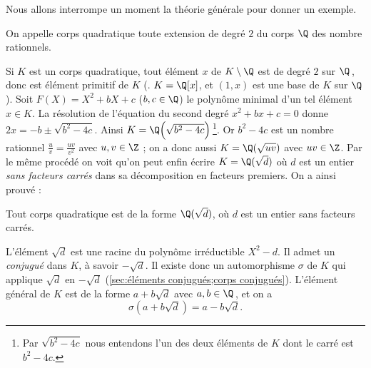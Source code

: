 \documentclass[11pt, %
  title in boldface,
  theorem in new line,
  theorem numbering = section,
  number theorems separately,
  simple name,
]{beaulivre}
\begin{document}
    Nous allons interrompe un moment la théorie générale pour donner un exemple.

    \begin{definition}
        On appelle corps quadratique toute extension de degré \( 2 \) du corps \( \Q \) des nombre rationnels.
    \end{definition}

    Si \( K \) est un corps quadratique, tout élément \( x \) de \( K \setminus \Q \) est de degré \( 2 \) sur \( \Q \)\,, donc est élément primitif de \( K \) (\ie. \( K = \Q[x] \), et \( (1,x) \) est une base de \( K \) sur \( \Q \)). Soit \( F(X) = X^2+bX+c \) (\( b,c \in \Q \)) le polynôme minimal d'un tel élément \( x \in K \). La résolution de l'équation du second degré \( x^2+bx+c = 0 \) donne \( 2x = -b \pm \sqrt{b^2-4c} \). Ainsi \( K = \Q\Bigl(\sqrt{b^2-4c}\Bigr) \)\,\footnote{Par \( \sqrt{b^2-4c} \) nous entendons l'un des deux éléments de \( K \) dont le carré est \( b^2-4c \).}. Or \( b^2-4c \) est un nombre rationnel \( \frac{u}{v} = \frac{uv}{v^2} \) avec \( u,v \in \Z \) ; on a donc aussi \( K = \Q(\sqrt{uv}) \) avec \( uv \in \Z \). Par le même procédé on voit qu'on peut enfin écrire \( K = \Q(\sqrt{d}) \) où \( d \) est un entier \emph{sans facteurs carrés} dans sa décomposition en facteurs premiers. On a ainsi prouvé :
    \begin{proposition}
        Tout corps quadratique est de la forme \( \Q(\sqrt{d}) \), où \( d \) est un entier sans facteurs carrés.
    \end{proposition}

    L'élément \( \sqrt{d} \) est une racine du polynôme irréductible \( X^2-d \). Il admet un \emph{conjugué} dans \( K \), à savoir \( -\sqrt{d} \). Il existe donc un automorphisme \( \sigma \) de \( K \) qui applique \( \sqrt{d} \) en \( -\sqrt{d} \) (\cref{sec:éléments conjugués;corps conjugués}). L'élément général de \( K \) est de la forme \( a+b\sqrt{d} \) avec \( a,b \in \Q \)\,, et on a
    \begin{equation}\label{eq:quadratique;automorphisme}
        \sigma(a+b\sqrt{d}) = a-b\sqrt{d}.
    \end{equation}
\end{document}
